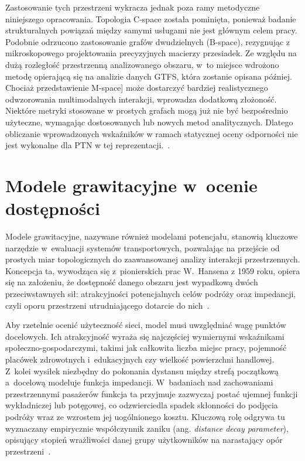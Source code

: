 \documentclass{pracamgr}
\begin{document}
Zastosowanie tych przestrzeni wykracza jednak poza ramy metodyczne niniejszego opracowania. Topologia \mbox{C-space} została pominięta, ponieważ badanie strukturalnych powiązań między samymi usługami nie jest głównym celem pracy. Podobnie odrzucono zastosowanie grafów dwudzielnych (\mbox{B-space}), rezygnując z mikroskopowego projektowania precyzyjnych macierzy przesiadek. Ze względu na dużą rozległość przestrzenną analizowanego obszaru, w~to miejsce wdrożono metodę opierającą się na analizie danych GTFS, która zostanie opisana później.
Chociaż przedstawienie \mbox{M-space}] może dostarczyć bardziej realistycznego odwzorowania multimodalnych interakcji, wprowadza dodatkową złożoność. Niektóre metryki stosowane w prostych grafach mogą już nie być bezpośrednio użyteczne, wymagając dostosowanych lub nowych metod analitycznych. Dlatego obliczanie wprowadzonych wskaźników w ramach statycznej oceny odporności nie jest wykonalne dla PTN w tej reprezentacji.~\cite{c-space, metropolitan, capetown}.


\section{Modele grawitacyjne w~ocenie dostępności}\label{section:modele_grawitacyjne}

Modele grawitacyjne, nazywane również modelami potencjału, stanowią kluczowe narzędzie w~ewaluacji systemów transportowych, pozwalając na przejście od prostych miar topologicznych do zaawansowanej analizy interakcji przestrzennych. Koncepcja ta, wywodząca się z~pionierskich prac W.~Hansena z 1959 roku, opiera się na założeniu, że dostępność danego obszaru jest wypadkową dwóch przeciwstawnych sił: atrakcyjności potencjalnych celów podróży oraz impedancji, czyli oporu przestrzeni utrudniającego dotarcie do nich~\cite{Kozlak_Aleksandra_Znaczenie_2010, gravity2, capetown}.

Aby rzetelnie ocenić użyteczność sieci, model musi uwzględniać wagę punktów docelowych. Ich atrakcyjność wyraża się najczęściej wymiernymi wskaźnikami społeczno-gospodarczymi, takimi jak całkowita liczba miejsc pracy, pojemność placówek zdrowotnych i~edukacyjnych czy wielkość powierzchni handlowej. Z~kolei wysiłek niezbędny do pokonania dystansu między strefą początkową a~docelową modeluje funkcja impedancji. W~badaniach nad zachowaniami przestrzennymi pasażerów funkcja ta przyjmuje zazwyczaj postać ujemnej funkcji wykładniczej lub potęgowej, co odzwierciedla spadek skłonności do podjęcia podróży wraz ze wzrostem jej uogólnionego kosztu. Kluczową rolę odgrywa tu wyznaczany empirycznie współczynnik zaniku (ang. \textit{distance decay parameter}), opisujący stopień wrażliwości danej grupy użytkowników na narastający opór przestrzeni~\cite{Kozlak_Aleksandra_Znaczenie_2010, gravity, gravity2, capetown}.
\end{document}
